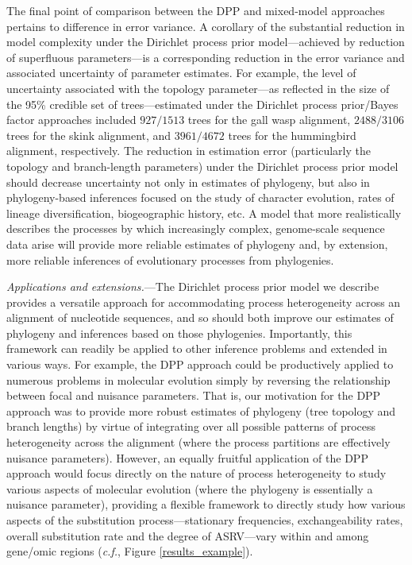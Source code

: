 \documentclass[11pt]{article}
\begin{document}
The final point of comparison between the DPP and mixed-model approaches pertains to difference in error variance.  
A corollary of the substantial reduction in model complexity under the Dirichlet process prior model---achieved by reduction of superfluous parameters---is a corresponding reduction in the error variance and associated uncertainty of parameter estimates.  
For example, the level of uncertainty associated with the topology parameter---as reflected in the size of the 95\% credible set of trees---estimated under the Dirichlet process prior/Bayes factor approaches included $927/1513$ trees for the gall wasp alignment, $2488/3106$ trees for the skink alignment, and $3961/4672$ trees for the hummingbird alignment, respectively. 
The reduction in estimation error (particularly the topology and branch-length parameters) under the Dirichlet process prior model should decrease uncertainty not only in estimates of phylogeny, but also in phylogeny-based inferences focused on the study of character evolution, rates of lineage diversification, biogeographic history, etc.
A model that more realistically describes the processes by which increasingly complex, genome-scale sequence data arise will provide more reliable estimates of phylogeny and, by extension, more reliable inferences of evolutionary processes from phylogenies. 

\bigskip
\noindent
{\it Applications and extensions.}---The Dirichlet process prior model we describe provides a versatile approach for accommodating process heterogeneity across an alignment of nucleotide sequences, and so should both improve our estimates of phylogeny and inferences based on those phylogenies. 
Importantly, this framework can readily be applied to other inference problems and extended in various ways.
For example, the DPP approach could be productively applied to numerous problems in molecular evolution simply by reversing the relationship between focal and nuisance parameters.
That is, our motivation for the DPP approach was to provide more robust estimates of phylogeny (tree topology and branch lengths) by virtue of integrating over all possible patterns of process heterogeneity across the alignment (where the process partitions are effectively nuisance parameters).
However, an equally fruitful application of the DPP approach would focus directly on the nature of process heterogeneity to study various aspects of molecular evolution (where the phylogeny is essentially a nuisance parameter), providing a flexible framework to directly study how various aspects of the substitution process---stationary frequencies, exchangeability rates, overall substitution rate and the degree of ASRV---vary within and among gene/omic regions (\emph{c.f.}, Figure \ref{results_example}).
\end{document}
